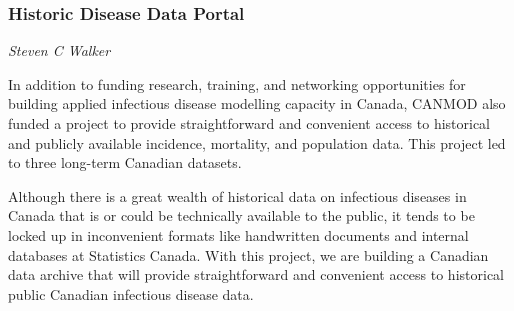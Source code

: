 \subsubsection{Historic Disease Data Portal}
\label{sec:iidda}

\textit{Steven C Walker}

In addition to funding research, training, and networking opportunities for building applied infectious disease modelling capacity in Canada, CANMOD also funded a project to provide straightforward and convenient access to historical and publicly available incidence, mortality, and population data. This project led to three long-term Canadian datasets.

Although there is a great wealth of historical data on infectious diseases in Canada that is or could be technically available to the public, it tends to be locked up in inconvenient formats like handwritten documents and internal databases at Statistics Canada. With this project, we are building a Canadian data archive that will provide straightforward and convenient access to historical public Canadian infectious disease data.

